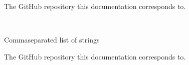 \documentclass[letterpaper,10pt,english]{sphinxmanual}
\begin{document}
\begin{fulllineitems}
\label{\detokenize{confval:confval-github_username}}~
\vspace{-45px}

\begin{DUlineblock}{0em}
\item[]  
\item[]  
\end{DUlineblock}

\end{fulllineitems}



\begin{fulllineitems}
\label{\detokenize{confval:confval-github_repository}}~
\vspace{-45px}

\begin{DUlineblock}{0em}
\item[]  
\item[]  
\end{DUlineblock}

\vspace{-25px}

The GitHub repository this documentation corresponds to.

\end{fulllineitems}



\begin{fulllineitems}
\label{\detokenize{confval:confval-conda_channels}}~
\vspace{-45px}

\begin{DUlineblock}{0em}
\item[]  Comma\sphinxhyphen{}separated list of strings
\item[]  
\end{DUlineblock}

\vspace{-25px}

The GitHub repository this documentation corresponds to.

\end{fulllineitems}
\end{document}

